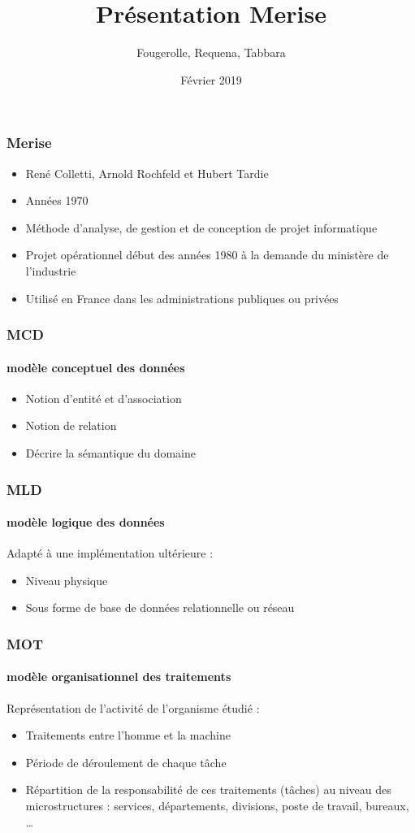 \documentclass{beamer}
\title{Présentation Merise}
\author{Fougerolle, Requena, Tabbara}
\date{Février 2019}
\begin{document}
\maketitle
\begin{frame}
\frametitle{Merise}
\begin{itemize}
\item René Colletti, Arnold Rochfeld et Hubert Tardie
\item Années 1970
\item Méthode d'analyse, de gestion et de conception de projet informatique
\item Projet opérationnel début des années 1980 à la demande du ministère de l'industrie
\item Utilisé en France dans les administrations publiques ou privées
\end{itemize}
\end{frame}
\begin{frame}
\frametitle{MCD}
\framesubtitle{modèle conceptuel des données}
\begin{itemize}
\item Notion d'entité et d'association
\item Notion de relation
\item Décrire la sémantique du domaine
\end{itemize}
\end{frame}
\begin{frame}
\frametitle{MLD}
\framesubtitle{modèle logique des données}
Adapté à une implémentation ultérieure :
\begin{itemize}
\item Niveau physique
\item Sous forme de base de données relationnelle ou réseau
\end{itemize}
\end{frame}
\begin{frame}
\frametitle{MOT}
\framesubtitle{modèle organisationnel des traitements} 
Représentation de l'activité de l'organisme étudié :
\begin{itemize}
\item Traitements entre l'homme et la machine \item Période de déroulement de chaque tâche
\item Répartition de la responsabilité de ces traitements (tâches) au niveau des microstructures : services, départements, divisions, poste de travail, bureaux, …
\end{itemize}
\end{frame}
\end{document}
